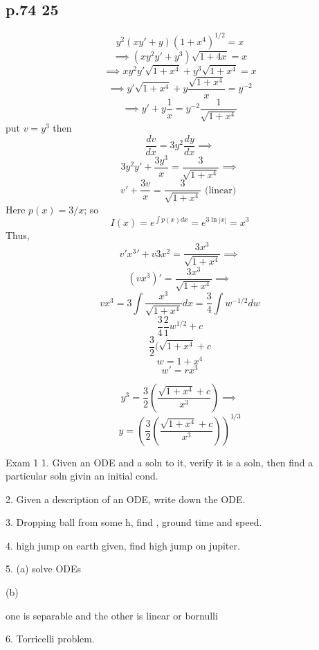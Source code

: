 \documentclass[10pt,a4paper]{article}
\begin{document}
  \subsection{p.74 25}
  \[ y^2(xy'+y)(1+x^4)^{1/2} = x \]
  \[ \implies (xy^2y' + y^3) \sqrt{1+4x} = x\]
  \[ \implies xy^2y' \sqrt{1+x^4} + y^3 \sqrt{1+x^4} = x \]
  \[ \implies y' \sqrt{1+x^4} + y \frac{ \sqrt{1+x^4}}{x} = y^{-2} \]
  \[ \implies y' +y \frac{1}{x} = y^{-2} \frac{1}{ \sqrt{1+x^4}} \]
  put \( v = y^3 \) then 
  \[ \frac{dv}{dx} = 3y^2 \frac{dy}{dx} \implies \]
  \[ 3y^2y' + \frac{3y^3}{x} = \frac{3}{ \sqrt{1+x^4}} \implies \]
  \[ v' + \frac{3v}{x} = \frac{3}{ \sqrt{1+x^4}} \text{ (linear) } \]
  Here \( p(x) = 3/x \); so\nonumber\\
  \[ I(x) = e^{\int p(x)dx} = e^{3\ln |x|} = x^3 \]
  Thus, 
  \[ v'x^3 ' + v3x^2 = \frac{3x^3}{ \sqrt{1+ x^4}} \implies \]
  \[ (vx^3)' = \frac{3x^3}{ \sqrt{1+x^4}} \implies \]
  \[ vx^3 = 3 \int \frac{x^3}{ \sqrt{1 + x^4}}dx = 
  \frac{3}{4} \int w^{-1/2} dw\]
  \[ \frac{3}{4} \frac{2}{1}w^{1/2} + c\]
  \[ \frac{3}{2} ( \sqrt{1+x^4} + c \]
  \[ w = 1+x^4  \]
  \[ w' = rx^3 \]

  \[ y^3 = \frac{3}{2} ( \frac{ \sqrt{1+x^4} + c}{x^3}) \implies  \]
  \[ y =  (\frac{3}{2} ( \frac{ \sqrt{1+x^4} + c}{x^3}))^{1/3}\] 


  Exam 1 
  1. Given an ODE and a soln to it, verify it is a soln, then find a
  particular soln givin an initial cond.

  2. Given a description of an ODE, write down the ODE. 

  3. Dropping ball from some h, find , ground time and speed.

  4. high jump on earth given, find high jump on jupiter. 

  5. (a) solve ODEs 

  (b) 

  one is separable and the other is linear or bornulli

  6. Torricelli problem. 


  
\end{document}
